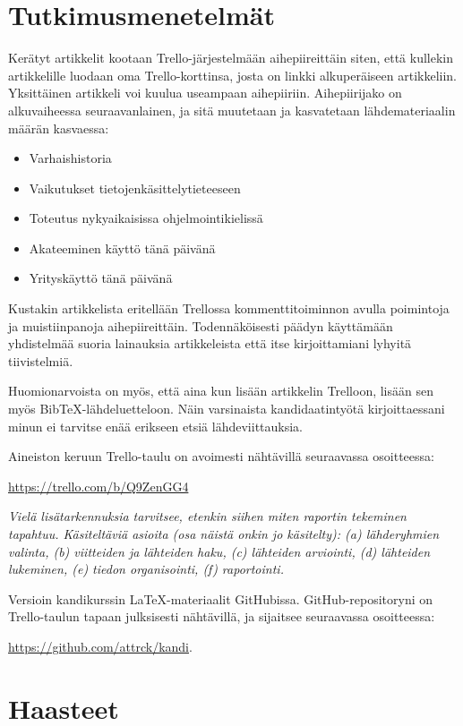 \documentclass[12pt,a4paper,finnish,oneside]{article}
\begin{document}
\section{Tutkimusmenetelmät}

Kerätyt artikkelit kootaan Trello-järjestelmään aihepiireittäin siten, että kullekin artikkelille luodaan oma Trello-korttinsa, josta on linkki alkuperäiseen artikkeliin. Yksittäinen artikkeli voi kuulua useampaan aihepiiriin. Aihepiirijako on alkuvaiheessa seuraavanlainen, ja sitä muutetaan ja kasvatetaan lähdemateriaalin määrän kasvaessa:

\begin{itemize}
  \item Varhaishistoria
  \item Vaikutukset tietojenkäsittelytieteeseen
  \item Toteutus nykyaikaisissa ohjelmointikielissä
  \item Akateeminen käyttö tänä päivänä
  \item Yrityskäyttö tänä päivänä
\end{itemize}

Kustakin artikkelista eritellään Trellossa kommenttitoiminnon avulla poimintoja ja muistiinpanoja aihepiireittäin. Todennäköisesti päädyn käyttämään yhdistelmää suoria lainauksia artikkeleista että itse kirjoittamiani lyhyitä tiivistelmiä.

Huomionarvoista on myös, että aina kun lisään artikkelin Trelloon, lisään sen myös BibTeX-lähdeluetteloon. Näin varsinaista kandidaatintyötä kirjoittaessani minun ei tarvitse enää erikseen etsiä lähdeviittauksia.

Aineiston keruun Trello-taulu on avoimesti nähtävillä seuraavassa osoitteessa:

\url{https://trello.com/b/Q9ZenGG4}

\emph{Vielä lisätarkennuksia tarvitsee, etenkin siihen miten raportin tekeminen tapahtuu. Käsiteltäviä asioita (osa näistä onkin jo käsitelty):
(a) lähderyhmien valinta,
(b) viitteiden ja lähteiden haku,
(c) lähteiden arviointi,
(d) lähteiden lukeminen,
(e) tiedon organisointi,
(f) raportointi. }

Versioin kandikurssin \LaTeX-materiaalit GitHubissa. GitHub-repositoryni on Trello-taulun tapaan julksisesti nähtävillä, ja sijaitsee seuraavassa osoitteessa:

\url{https://github.com/attrck/kandi}.

\section{Haasteet}
\end{document}
